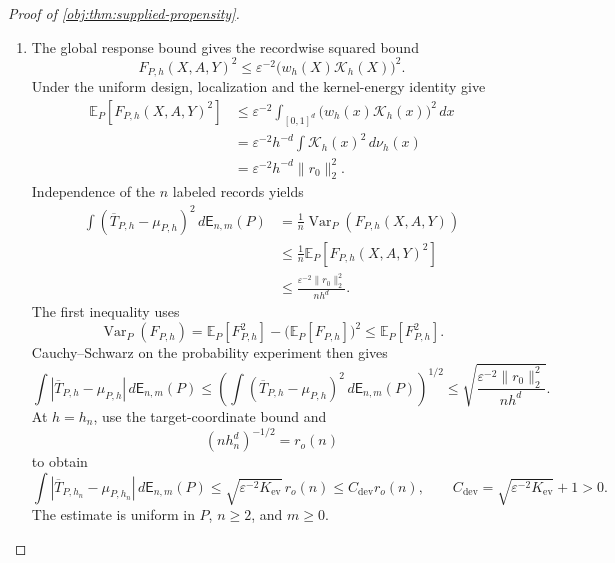 \documentclass[11pt]{article}
\begin{document}
\begin{proof}[Proof of \cref{obj:thm:supplied-propensity}]
\begin{enumerate}
\item The global response bound gives the recordwise squared bound
\[
F_{P,h}(X,A,Y)^2
\le\varepsilon^{-2}\bigl(w_h(X)\mathcal K_h(X)\bigr)^2.
\]
Under the uniform design, localization and the kernel-energy identity give
\[
\begin{aligned}
\mathbb E_P[F_{P,h}(X,A,Y)^2]
&\le
\varepsilon^{-2}\int_{[0,1]^d}
\bigl(w_h(x)\mathcal K_h(x)\bigr)^2\,dx\\
&=
\varepsilon^{-2}h^{-d}\int\mathcal K_h(x)^2\,d\nu_h(x)\\
&=
\varepsilon^{-2}h^{-d}\|r_0\|_2^2.
\end{aligned}
\]
Independence of the \(n\) labeled records yields
\[
\begin{aligned}
\int(\overline T_{P,h}-\mu_{P,h})^2\,d\mathsf E_{n,m}(P)
&=
\frac1n\operatorname{Var}_P(F_{P,h}(X,A,Y))\\
&\le\frac1n\mathbb E_P[F_{P,h}(X,A,Y)^2]\\
&\le\frac{\varepsilon^{-2}\|r_0\|_2^2}{nh^d}.
\end{aligned}
\]
The first inequality uses
\[
\operatorname{Var}_P(F_{P,h})
=
\mathbb E_P[F_{P,h}^2]
-\bigl(\mathbb E_P[F_{P,h}]\bigr)^2
\le\mathbb E_P[F_{P,h}^2].
\]
Cauchy--Schwarz on the probability experiment then gives
\[
\int|\overline T_{P,h}-\mu_{P,h}|\,d\mathsf E_{n,m}(P)
\le
\left(
\int(\overline T_{P,h}-\mu_{P,h})^2\,d\mathsf E_{n,m}(P)
\right)^{1/2}
\le
\sqrt{\frac{\varepsilon^{-2}\|r_0\|_2^2}{nh^d}}.
\]
At \(h=h_n\), use the target-coordinate bound and
\[
(nh_n^d)^{-1/2}=r_o(n)
\]
to obtain
\[
\int|\overline T_{P,h_n}-\mu_{P,h_n}|\,d\mathsf E_{n,m}(P)
\le\sqrt{\varepsilon^{-2}K_{\mathrm{ev}}}\,r_o(n)
\le C_{\mathrm{dev}}r_o(n),
\qquad
C_{\mathrm{dev}}=\sqrt{\varepsilon^{-2}K_{\mathrm{ev}}}+1>0.
\]
The estimate is uniform in \(P\), \(n\ge2\), and \(m\ge0\).


\end{enumerate}
\end{proof}
\end{document}
